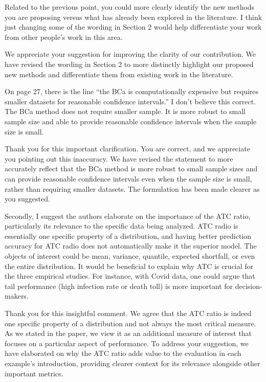 \documentclass[12pt]{journalrebuttal}
\begin{document}
\begin{revcomment}
    Related to the previous point, you could more clearly identify the new methods you are proposing versus what has already been explored in the literature. I think just changing some of the wording in Section 2 would help differentiate your work from other people's work in this area.
\end{revcomment}
\begin{response}
    We appreciate your suggestion for improving the clarity of our contribution. We have revised the wording in Section 2 to more distinctly highlight our proposed new methods and differentiate them from existing work in the literature.
\end{response}

\begin{revcomment}
On page 27, there is the line \enquote{the BCa is computationally expensive but requires smaller datasets for reasonable confidence intervals.} I don't believe this correct. The BCa method does not require smaller sample. It is more robust to small sample size and able to provide reasonable confidence intervals when the sample size is small.
\end{revcomment}
\begin{response}
    Thank you for this important clarification. You are correct, and we appreciate you pointing out this inaccuracy. We have revised the statement to more accurately reflect that the BCa method is more robust to small sample sizes and can provide reasonable confidence intervals even when the sample size is small, rather than requiring smaller datasets. The formulation has been made clearer as you suggested.
\end{response}


\nextreviewer

\begin{revcomment}
    Secondly, I suggest the authors elaborate on the importance of the ATC ratio, particularly its relevance to the specific data being analyzed. ATC radio is essentially one specific property of a distribution, and having better prediction accuracy for ATC radio does not automatically make it the superior model. The objects of interest could be mean, variance, quantile, expected shortfall, or even the entire distribution. It would be beneficial to explain why ATC is crucial for the three empirical studies. For instance, with Covid data, one could argue that tail performance (high infection rate or death toll) is more important for decision-makers.
\end{revcomment}
\begin{response}
    Thank you for this insightful comment. We agree that the ATC ratio is indeed one specific property of a distribution and not always the most critical measure. As we stated in the paper, we view it as an additional measure of interest that focuses on a particular aspect of performance. To address your suggestion, we have elaborated on why the ATC ratio adds value to the evaluation in each example's introduction, providing clearer context for its relevance alongside other important metrics.
\end{response}
\end{document}
